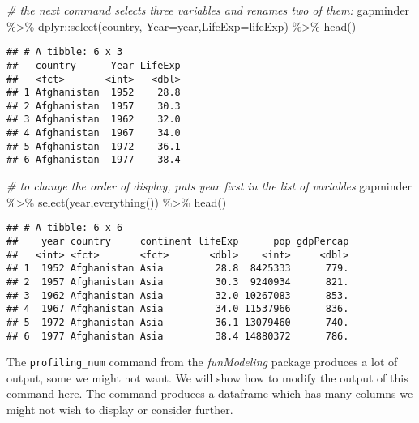 \documentclass[
]{book}
\newenvironment{Shaded}{\begin{snugshade}}{\end{snugshade}}
\newcommand{\AttributeTok}[1]{\textcolor[rgb]{0.77,0.63,0.00}{#1}}
\newcommand{\CommentTok}[1]{\textcolor[rgb]{0.56,0.35,0.01}{\textit{#1}}}
\newcommand{\FunctionTok}[1]{\textcolor[rgb]{0.00,0.00,0.00}{#1}}
\newcommand{\NormalTok}[1]{#1}
\newcommand{\SpecialCharTok}[1]{\textcolor[rgb]{0.00,0.00,0.00}{#1}}
\begin{document}
\begin{Shaded}
\begin{Highlighting}[]
\CommentTok{\# the next command selects three variables and renames two of them:}
\NormalTok{gapminder }\SpecialCharTok{\%\textgreater{}\%} 
\NormalTok{  dplyr}\SpecialCharTok{::}\FunctionTok{select}\NormalTok{(country, }\AttributeTok{Year=}\NormalTok{year,}\AttributeTok{LifeExp=}\NormalTok{lifeExp) }\SpecialCharTok{\%\textgreater{}\%} 
  \FunctionTok{head}\NormalTok{()}
\end{Highlighting}
\end{Shaded}

\begin{verbatim}
## # A tibble: 6 x 3
##   country      Year LifeExp
##   <fct>       <int>   <dbl>
## 1 Afghanistan  1952    28.8
## 2 Afghanistan  1957    30.3
## 3 Afghanistan  1962    32.0
## 4 Afghanistan  1967    34.0
## 5 Afghanistan  1972    36.1
## 6 Afghanistan  1977    38.4
\end{verbatim}

\begin{Shaded}
\begin{Highlighting}[]
\CommentTok{\# to change the order of display, puts year first in the list of variables}
\NormalTok{gapminder }\SpecialCharTok{\%\textgreater{}\%} 
  \FunctionTok{select}\NormalTok{(year,}\FunctionTok{everything}\NormalTok{()) }\SpecialCharTok{\%\textgreater{}\%} 
  \FunctionTok{head}\NormalTok{()}
\end{Highlighting}
\end{Shaded}

\begin{verbatim}
## # A tibble: 6 x 6
##    year country     continent lifeExp      pop gdpPercap
##   <int> <fct>       <fct>       <dbl>    <int>     <dbl>
## 1  1952 Afghanistan Asia         28.8  8425333      779.
## 2  1957 Afghanistan Asia         30.3  9240934      821.
## 3  1962 Afghanistan Asia         32.0 10267083      853.
## 4  1967 Afghanistan Asia         34.0 11537966      836.
## 5  1972 Afghanistan Asia         36.1 13079460      740.
## 6  1977 Afghanistan Asia         38.4 14880372      786.
\end{verbatim}

The \texttt{profiling\_num} command from the \emph{funModeling} package produces a lot of output, some we might not want. We will
show how to modify the output of this command here. The command produces a dataframe which has many columns we might not wish to display or consider further.
\end{document}
